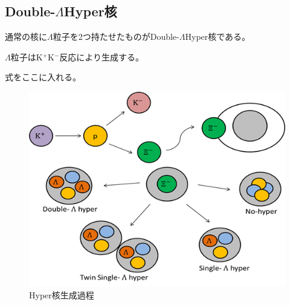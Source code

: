 \documentclass[12pt,a4paper]{jarticle}
\begin{document}
\subsection{Double-$\Lambda$Hyper核}
通常の核に$\Lambda$粒子を2つ持たせたものがDouble-$\Lambda$Hyper核である。
\par
$\Lambda$粒子はK$^+$K$^-$反応により生成する。
\par
式をここに入れる。
\begin{figure}[htbp]
    \begin{center}
     \includegraphics[width=120mm]{makehyper.png}
    \end{center}
    \caption{Hyper核生成過程\label{fig:makehyper}}
   \end{figure}
\newpage
\end{document}
